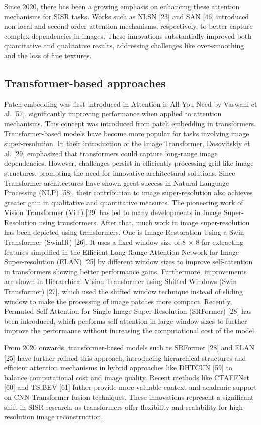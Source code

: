 \documentclass[twocolumn]{svjour3}          %
\begin{document}
Since 2020, there has been a growing emphasis on enhancing these attention mechanisms for SISR tasks. Works such as NLSN [23] and SAN [46] introduced non-local and second-order attention mechanisms, respectively, to better capture complex dependencies in images. These innovations substantially improved both quantitative and qualitative results, addressing challenges like over-smoothing and the loss of fine textures.


\subsection{Transformer-based approaches}
Patch embedding was first introduced in Attention is All You Need by Vaswani et al. [57], significantly improving performance when applied to attention mechanisms. This concept was introduced from patch embedding in transformers. Transformer-based models have become more popular for tasks involving image super-resolution. In their introduction of the Image Transformer, Dosovitskiy et al. [29] emphasized that transformers could capture long-range image dependencies. However, challenges persist in efficiently processing grid-like image structures, prompting the need for innovative architectural solutions. Since Transformer architectures have shown great success in Natural Language Processing (NLP) [58], their contribution to image super-resolution also achieves greater gain in qualitative and quantitative measures. The pioneering work of Vision Transformer (ViT) [29] has led to many developments in Image Super-Resolution using transformers. After that, much work in image super-resolution has been depicted using transformers. One is Image Restoration Using a Swin Transformer (SwinIR) [26]. It uses a fixed window size of 8 × 8 for extracting features simplified in the Efficient Long-Range Attention Network for Image Super-resolution (ELAN) [25] by different window sizes to improve self-attention in transformers showing better performance gains. Furthermore, improvements are shown in Hierarchical Vision Transformer using Shifted Windows (Swin Transformer) [27], which used the shifted window technique instead of sliding window to make the processing of image patches more compact. Recently, Permuted Self-Attention for Single Image Super-Resolution (SRFormer) [28] has been introduced, which performs self-attention in large window sizes to further improve the performance without increasing the computational cost of the model. 

From 2020 onwards, transformer-based models such as SRFormer [28] and ELAN [25] have further refined this approach, introducing hierarchical structures and efficient attention mechanisms in hybrid approaches like DHTCUN [59] to balance computational cost and image quality. Recent methods like CTAFFNet [60] and TS:BEV [61] futher provide more valuable context and academic support on CNN-Transformer fusion techniques. These innovations represent a significant shift in SISR research, as transformers offer flexibility and scalability for high-resolution image reconstruction.
\end{document}
